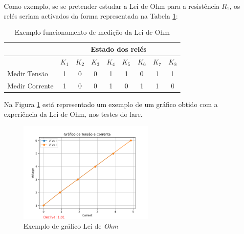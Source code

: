 
Como exemplo, se se pretender estudar a Lei de Ohm para a resistência $R_{1}$, os relés seriam activados da forma representada na Tabela \ref{Table:exemplomedicaoohm}:

\begin{table}[htb]
	\centering
	\caption{Exemplo funcionamento de medição da Lei de Ohm} 
	
	\label{Table:exemplomedicaoohm}
	\begin{tabular}{lcccccccc}
		\toprule
		               & \multicolumn{8}{c}{Estado dos relés}                                                                       \\
		\midrule
		               & $K_{1}$                              & $K_{2}$ & $K_{3}$ & $K_{4}$ & $K_{5}$ & $K_{6}$ & $K_{7}$ & $K_{8}$ \\
		\midrule
		Medir Tensão   & 1                                    & 0       & 0       & 1       & 1       & 0       & 1       & 1       \\
		\midrule
		Medir Corrente & 1                                    & 0       & 0       & 1       & 0       & 1       & 1       & 0       \\
		\bottomrule
	\end{tabular}
\end{table}

Na Figura \ref{fig:graphohm} está representado um exemplo de um gráfico obtido com a experiência da Lei de Ohm, nos testes do \acrshort{lare}.

\begin{figure}[hbtp]
	\centering
	\includegraphics[width=0.6\textwidth]{figures/ohm_graph.png}
	\caption{Exemplo de gráfico Lei de \textit{Ohm}}
	\label{fig:graphohm}
\end{figure}

